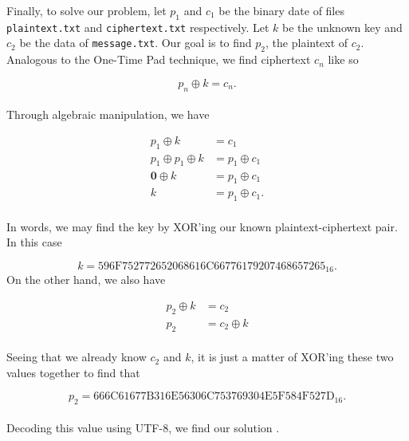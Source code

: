 \documentclass[12pt]{article}
\begin{document}
Finally, to  solve our problem, let $p_1$ and $c_1$ be the binary date of files \texttt{plaintext.txt} and \texttt{ciphertext.txt} respectively. Let $k$ be the unknown key and $c_2$ be the data of \texttt{message.txt}. Our goal is to find $p_2$, the plaintext of $c_2$. Analogous to the One-Time Pad technique, we find ciphertext $c_n$ like so

$$p_n \oplus k = c_n.$$
\\
Through algebraic manipulation, we have

\begin{align*}
p_1 \oplus k &= c_1 \\
p_1 \oplus p_1 \oplus k &= p_1 \oplus c_1 \\
\mathbf{0} \oplus k &= p_1 \oplus c_1 \\
k &= p_1 \oplus c_1.
\end{align*}
\\
In words, we may find the key by XOR'ing our known plaintext-ciphertext pair. In this case 

$$k = \mathrm{596F752772652068616C66776179207468657265}_{16}.$$
\newpage
\noindent
On the other hand, we also have

\begin{align*}
p_2 \oplus k &= c_2 \\
p_2 &= c_2 \oplus k
\end{align*}
\\
Seeing that we already know $c_2$ and $k$, it is just a matter of XOR'ing these two values together to find that

$$p_2 = \mathrm{666C61677B316E56306C753769304E5F584F527D}_{16}.$$
\\
Decoding this value using UTF-8, we find our solution .
\end{document}
